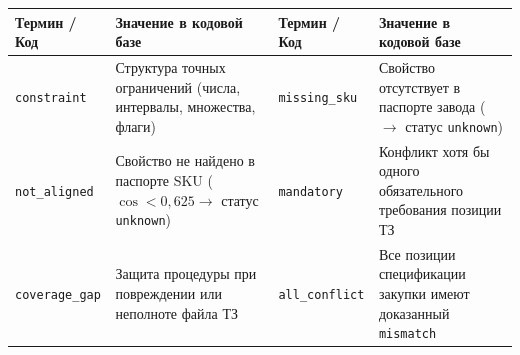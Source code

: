 \documentclass[10pt,a4paper]{article}
\begin{document}
\vspace{0.1em}
\noindent\begin{minipage}{\textwidth}
\centering
\scriptsize
\renewcommand{\arraystretch}{0.80}
\label{tab:glossary}
\begin{tabularx}{\textwidth}{l Y l Y}
\toprule
\textbf{Термин / Код} & \textbf{Значение в кодовой базе} & \textbf{Термин / Код} & \textbf{Значение в кодовой базе} \\
\midrule
\texttt{constraint} & Структура точных ограничений (числа, интервалы, множества, флаги) & \texttt{missing\_sku} & Свойство отсутствует в паспорте завода ($\to$ статус \texttt{unknown}) \\
\texttt{not\_aligned} & Свойство не найдено в паспорте SKU ($\cos < 0{,}625 \to$ статус \texttt{unknown}) & \texttt{mandatory} & Конфликт хотя бы одного обязательного требования позиции ТЗ \\
\texttt{coverage\_gap} & Защита процедуры при повреждении или неполноте файла ТЗ & \texttt{all\_conflict} & Все позиции спецификации закупки имеют доказанный \texttt{mismatch} \\
\bottomrule
\end{tabularx}
\end{minipage}
\end{document}
